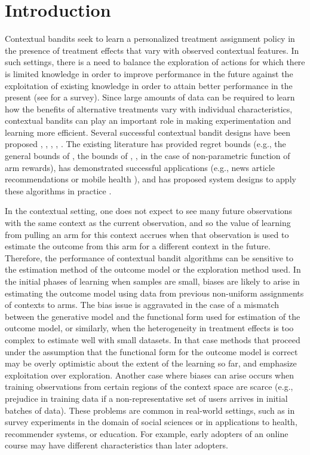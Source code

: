 \documentclass[letterpaper]{article} %
\begin{document}
\section{Introduction}
Contextual bandits seek to learn a personalized treatment assignment policy in the presence of treatment effects that vary with observed contextual features.
In such settings, there is a need to balance the exploration of actions for which there is limited knowledge in order to improve performance in the future against the exploitation of existing knowledge in order to attain better performance in the present (see \cite{bubeck2012regret} for a survey).
Since large amounts of data can be required to learn how the benefits of alternative treatments vary with individual characteristics, contextual bandits can play an important role in making experimentation and learning more efficient.
Several successful contextual bandit designs have been proposed \cite{auer-linrel}, \cite{li-linucb}, \cite{agrawal-lints}, \cite{agarwal-ilovetoconbandits}, \cite{bastani2015online}.
The existing literature has provided regret bounds (e.g., the general bounds of \cite{russo-vanroy}, the bounds of  \cite{rigollet-nonparamtheory}, \cite{perchet-nonparamtheory}, \cite{slivkins-nonparamtheory} in the case of non-parametric function of arm rewards), has demonstrated successful applications (e.g., news article recommendations \cite{li-linucb} or mobile health \cite{lei-mhealth}), and has proposed system designs to apply these algorithms in practice \cite{agarwal-debt}.

In the contextual setting, one does not expect to see many future observations with the same context as the current observation, and so the value of learning from pulling an arm for this context accrues when that observation is used to estimate the outcome from this arm for a different context in the future.
Therefore, the performance of contextual bandit algorithms can be sensitive to the estimation method of the outcome model or the exploration method used.
In the initial phases of learning when samples are small, biases are likely to arise in estimating the outcome model using data from previous non-uniform assignments of contexts to arms.
The bias issue is aggravated in the case of a mismatch between the generative model and the functional form used for estimation of the outcome model, or similarly, when the heterogeneity in treatment effects is too complex to estimate well with small datasets.  In that case methods that proceed under the assumption that the functional form for the outcome model is correct may  be overly optimistic about the extent  of the learning so far, and emphasize exploitation over exploration.
Another case where biases can arise occurs when training observations from certain regions of the context space are scarce (e.g., prejudice in training data if a non-representative set of users arrives in initial batches of data).
These problems are common in real-world settings, such as in survey experiments in the domain of social sciences or in applications to health, recommender systems, or education.
For example, early adopters of an online course may have different characteristics than later adopters.
\end{document}
